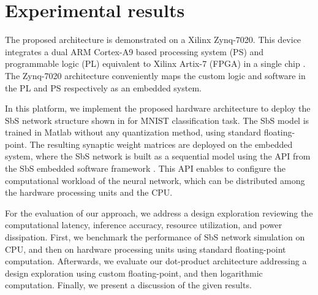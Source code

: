 \section{Experimental results}
\label{sec:experimental_results}
The proposed architecture is demonstrated on a Xilinx Zynq-7020. This device integrates a dual ARM Cortex-A9 based processing system (PS) and programmable logic (PL) equivalent to Xilinx Artix-7 (FPGA) in a single chip \cite{xilinx2015zynq}. The Zynq-7020 architecture conveniently maps the custom logic and software in the PL and PS respectively as an embedded system.

In this platform, we implement the proposed hardware architecture to deploy the SbS network structure shown in  for MNIST classification task. The SbS model is trained in Matlab without any quantization method, using standard floating-point. The resulting synaptic weight matrices are deployed on the embedded system, where the SbS network is built as a sequential model using the API from the SbS embedded software framework \cite{nevarez2020accelerator}. This API enables to configure the computational workload of the neural network, which can be distributed among the hardware processing units and the CPU.

For the evaluation of our approach, we address a design exploration reviewing the computational latency, inference accuracy, resource utilization, and power dissipation. First, we benchmark the performance of SbS network simulation on CPU, and then on hardware processing units using standard floating-point computation. Afterwards, we evaluate our dot-product architecture addressing a design exploration using custom floating-point, and then logarithmic computation. Finally, we present a discussion of the given results.

